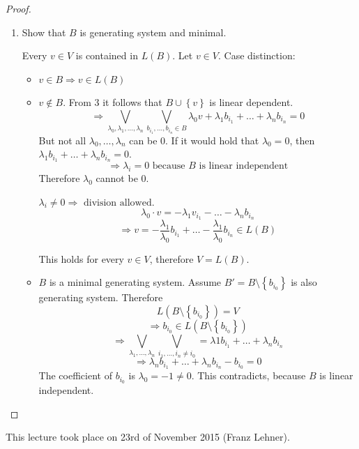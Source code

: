 \documentclass[a4paper,landscape,twocolumn]{article}
\newcommand\meta[3]{This #1 took place on #2 (#3).\par}
\newcommand\set[1]{\left\{#1\right\}}
\begin{document}
\begin{proof}
\begin{description}
      \begin{enumerate}
        \item Show that $B$ is generating system and minimal.

          Every $v \in V$ is contained in $L(B)$. Let $v \in V$.
          Case distinction:
          \begin{itemize}
            \item $v \in B \Rightarrow v \in L(B)$
            \item $v \not\in B$.
              From 3 it follows that $B \cup \set{v}$ is linear dependent.
              \[
                  \Rightarrow \bigvee_{\lambda_0, \lambda_1, \ldots, \lambda_n} \bigvee_{b_{i_1}, \ldots, b_{i_n} \in B}
                  \lambda_0 v + \lambda_1 b_{i_1} + \ldots + \lambda_n b_{i_n} = 0
              \]
              But not all $\lambda_0, \ldots, \lambda_n$ can be 0.
              If it would hold that $\lambda_0 = 0$, then $\lambda_1 b_{i_1} + \ldots + \lambda_n b_{i_n} = 0$.
              \[ \Rightarrow \lambda_i = 0 \text{ because } B \text{ is linear independent} \]
              Therefore $\lambda_0$ cannot be $0$.

              $\lambda_i \neq 0 \Rightarrow \text{ division allowed}$.
              \[ \lambda_0 \cdot v = -\lambda_1 v_{i_1} - \ldots - \lambda_n b_{i_n} \]
              \[ \Rightarrow v = -\frac{\lambda_1}{\lambda_0} b_{i_1} + \ldots - \frac{\lambda_1}{\lambda_0} b_{i_n} \in L(B) \]

              This holds for every $v \in V$, therefore $V = L(B)$.
            \item
              $B$ is a minimal generating system.
              Assume $B' = B \setminus \set{b_{i_0}}$ is also generating system.
              Therefore \[ L(B \setminus \set{b_{i_0}}) = V \]
              \[ \Rightarrow b_{i_0} \in L(B \setminus \set{b_{i_0}}) \]
              \[ \Rightarrow \bigvee_{\lambda_1, \ldots, \lambda_n} \bigvee_{i_1, \ldots, i_n \neq i_0} = \lambda 1 b_{i_1} + \ldots + \lambda_n b_{i_n} \]
              \[ \Rightarrow \lambda_n b_{i_1} + \ldots + \lambda_n b_{i_n} - b_{i_0} = 0 \]
              The coefficient of $b_{i_0}$ is $\lambda_0 = - 1 \neq 0$.
              This contradicts, because $B$ is linear independent.
          \end{itemize}
      \end{enumerate}
  \end{description}
\end{proof}

\meta{lecture}{23rd of November 2015}{Franz Lehner}
\end{document}
